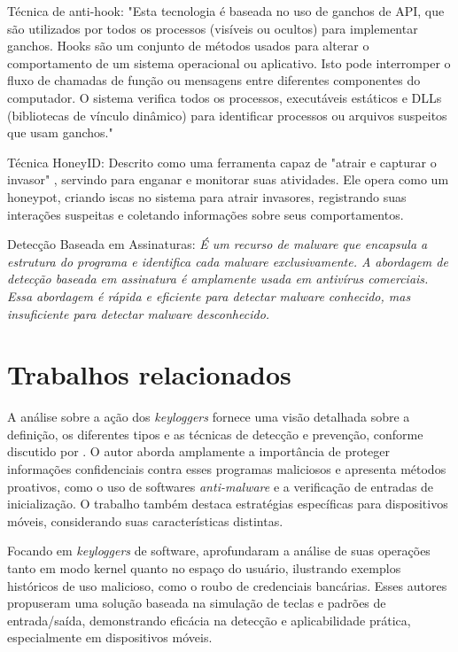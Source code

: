 \documentclass[12pt]{article}
\begin{document}
Técnica de anti-hook: "Esta tecnologia é baseada no uso de ganchos de API, que são utilizados por todos os processos (visíveis ou ocultos) para implementar ganchos. Hooks são um conjunto de métodos usados para alterar o comportamento de um sistema operacional ou aplicativo. Isto pode interromper o fluxo de chamadas de função ou mensagens entre diferentes componentes do computador. O sistema verifica todos os processos, executáveis estáticos e DLLs (bibliotecas de vínculo dinâmico) para identificar processos ou arquivos suspeitos que usam ganchos."\citep{solairaj2016keyloggers}

Técnica HoneyID: Descrito como uma ferramenta capaz de "atrair e capturar o invasor" \citep{10124477}, servindo para enganar e monitorar suas atividades. Ele opera como um honeypot, criando iscas no sistema para atrair invasores, registrando suas interações suspeitas e coletando informações sobre seus comportamentos.

Detecção Baseada em Assinaturas: \textit{É um recurso de malware que encapsula a estrutura do programa e identifica cada malware exclusivamente. A abordagem de detecção baseada em assinatura é amplamente usada em antivírus comerciais. Essa abordagem é rápida e eficiente para detectar malware conhecido, mas insuficiente para detectar malware desconhecido.} \citep{aslan2020comprehensive}

\section{Trabalhos relacionados}

A análise sobre a ação dos \textit{keyloggers} fornece uma visão detalhada sobre a definição, os diferentes tipos e as técnicas de detecção e prevenção, conforme discutido por \citep{singh2021keylogger}. O autor aborda amplamente a importância de proteger informações confidenciais contra esses programas maliciosos e apresenta métodos proativos, como o uso de softwares \textit{anti-malware} e a verificação de entradas de inicialização. O trabalho também destaca estratégias específicas para dispositivos móveis, considerando suas características distintas.

Focando em \textit{keyloggers} de software, \citep{wajahat2019novel} aprofundaram a análise de suas operações tanto em modo kernel quanto no espaço do usuário, ilustrando exemplos históricos de uso malicioso, como o roubo de credenciais bancárias. Esses autores propuseram uma solução baseada na simulação de teclas e padrões de entrada/saída, demonstrando eficácia na detecção e aplicabilidade prática, especialmente em dispositivos móveis.
\end{document}
